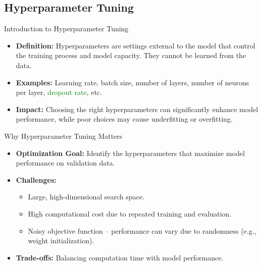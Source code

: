\documentclass[serif, aspectratio=169]{beamer}
\begin{document}


\subsection{Hyperparameter Tuning}

\begin{frame}{Introduction to Hyperparameter Tuning}
    \begin{itemize}
        \item \textbf{Definition:} Hyperparameters are settings external to the model that control the training process and model capacity. They cannot be learned from the data.
        \item \textbf{Examples:} Learning rate, batch size, number of layers, number of neurons per layer, \textcolor{green}{dropout rate}, etc.
        \item \textbf{Impact:} Choosing the right hyperparameters can significantly enhance model performance, while poor choices may cause underfitting or overfitting.
    \end{itemize}
\end{frame}


\begin{frame}{Why Hyperparameter Tuning Matters}
    \begin{itemize}
        \item \textbf{Optimization Goal:} Identify the hyperparameters that maximize model performance on validation data.
        \item \textbf{Challenges:}
            \begin{itemize}
                \item Large, high-dimensional search space.
                \item High computational cost due to repeated training and evaluation.
                \item Noisy objective function – performance can vary due to randomness (e.g., weight initialization).
            \end{itemize}
        \item \textbf{Trade-offs:} Balancing computation time with model performance.
    \end{itemize}
\end{frame}
\end{document}
